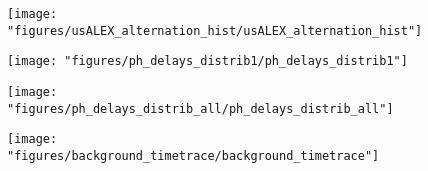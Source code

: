 

\usepackage[utf8]{inputenc}
\usepackage[LGR,T1]{fontenc}
\usepackage{textcomp}

\usepackage{fancyref}
\usepackage{hyperref}
\usepackage{cite}

\makeatletter
\newcommand{\verbatimfont}[1]{\renewcommand{\verbatim@font}{\ttfamily#1}}
\makeatother

\author{Antonino Ingargiola}
\title{}



\verbatimfont{\small}

\maketitle

\begin{abstract}

\end{abstract}

\tableofcontents





\begin{figure}
\begin{center}
\texttt{[image: "figures/usALEX\_alternation\_hist/usALEX\_alternation\_hist"]}
\caption[]{}
\end{center}
\end{figure}



\begin{figure}
\begin{center}
\texttt{[image: "figures/ph\_delays\_distrib1/ph\_delays\_distrib1"]}
\caption[]{}
\end{center}
\end{figure}

\begin{figure}
\begin{center}
\texttt{[image: "figures/ph\_delays\_distrib\_all/ph\_delays\_distrib\_all"]}
\caption[]{}
\end{center}
\end{figure}

\begin{figure}
\begin{center}
\texttt{[image: "figures/background\_timetrace/background\_timetrace"]}
\caption[]{}
\end{center}
\end{figure}


